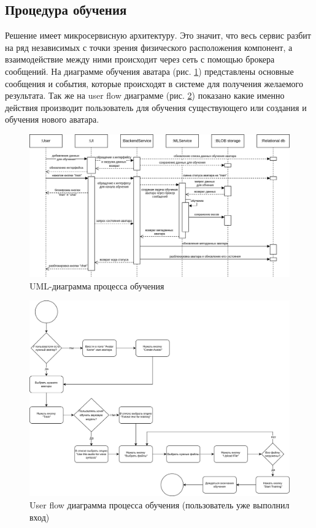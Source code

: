 \subsection{Процедура обучения}
Решение имеет микросервисную архитектуру. Это значит, что весь сервис разбит на ряд независимых с точки зрения физического расположения компонент, а взаимодействие между ними происходит через сеть с помощью брокера сообщений. На диаграмме обучения аватара (рис. \ref{fig:uml-train}) представлены основные сообщения и события, которые происходят в системе для получения желаемого результата. Так же на user flow диаграмме (рис. \ref{fig:uf-train}) показано какие именно действия производит пользователь для обучения существующего или создания и обучения нового аватара.

 \begin{figure}[h!]
     \centering
     \includegraphics[width=1.0\linewidth]{images/uml-train-rus.png}
     \caption{UML-диаграмма процесса обучения}
     \label{fig:uml-train}
 \end{figure}
 \begin{figure}[h!]
    \centering
    \includegraphics[width=1.0\linewidth]{images/UF-train-avatar.png}
    \caption{User flow диаграмма процесса обучения (пользователь уже выполнил вход)}
    \label{fig:uf-train}
\end{figure}

